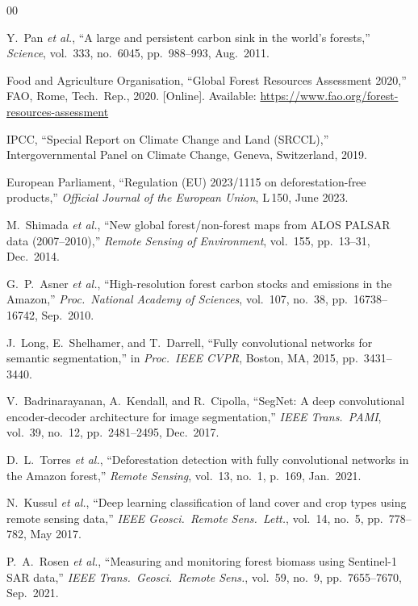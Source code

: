 \documentclass[10pt,conference]{IEEEtran}
\begin{document}
\begin{thebibliography}{00}

Y.~Pan \textit{et al.}, ``A large and persistent carbon sink in the world's
forests,'' \textit{Science}, vol.~333, no.~6045, pp.~988--993, Aug.\ 2011.

Food and Agriculture Organisation, ``Global Forest Resources Assessment 2020,''
FAO, Rome, Tech.\ Rep., 2020. [Online]. Available: \url{https://www.fao.org/forest-resources-assessment}

IPCC, ``Special Report on Climate Change and Land (SRCCL),''
Intergovernmental Panel on Climate Change, Geneva, Switzerland, 2019.

European Parliament, ``Regulation (EU) 2023/1115 on deforestation-free products,''
\textit{Official Journal of the European Union}, L\,150, June 2023.

M.~Shimada \textit{et al.}, ``New global forest/non-forest maps from ALOS PALSAR
data (2007--2010),'' \textit{Remote Sensing of Environment}, vol.~155,
pp.~13--31, Dec.\ 2014.

G.~P.~Asner \textit{et al.}, ``High-resolution forest carbon stocks and emissions
in the Amazon,'' \textit{Proc.\ National Academy of Sciences}, vol.~107,
no.~38, pp.~16738--16742, Sep.\ 2010.

J.~Long, E.~Shelhamer, and T.~Darrell, ``Fully convolutional networks for
semantic segmentation,'' in \textit{Proc.\ IEEE CVPR}, Boston, MA, 2015,
pp.~3431--3440.

V.~Badrinarayanan, A.~Kendall, and R.~Cipolla, ``SegNet: A deep convolutional
encoder-decoder architecture for image segmentation,'' \textit{IEEE Trans.\
PAMI}, vol.~39, no.~12, pp.~2481--2495, Dec.\ 2017.

D.~L.~Torres \textit{et al.}, ``Deforestation detection with fully convolutional
networks in the Amazon forest,'' \textit{Remote Sensing}, vol.~13, no.~1,
p.~169, Jan.\ 2021.

N.~Kussul \textit{et al.}, ``Deep learning classification of land cover and crop
types using remote sensing data,'' \textit{IEEE Geosci.\ Remote Sens.\ Lett.},
vol.~14, no.~5, pp.~778--782, May 2017.

P.~A.~Rosen \textit{et al.}, ``Measuring and monitoring forest biomass using
Sentinel-1 SAR data,'' \textit{IEEE Trans.\ Geosci.\ Remote Sens.},
vol.~59, no.~9, pp.~7655--7670, Sep.\ 2021.


\end{thebibliography}
\end{document}
